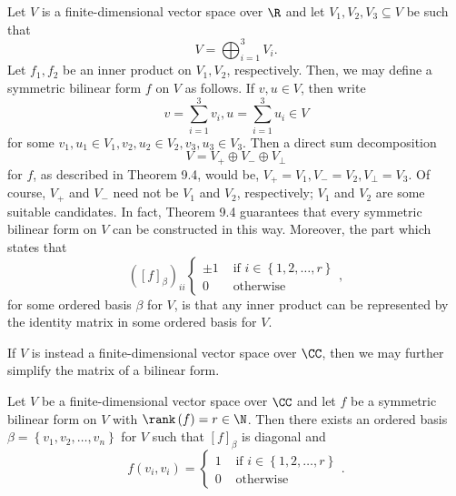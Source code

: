 \documentclass[linearalgebra]{subfiles}
\begin{document}
    \begin{remark}
        Let $V$ is a finite-dimensional vector space over $\R$ and let $V_1,V_2,V_3\subseteq V$ be such that
        \begin{equation*}
            V = \bigoplus^{3}_{i=1} V_i.
        \end{equation*}
        Let $f_1,f_2$ be an inner product on $V_1,V_2$, respectively. Then, we may define a symmetric bilinear form $f$ on $V$ as follows. If $v,u\in V$, then write
        \begin{equation*}
            v = \sum^{3}_{i=1} v_i, u = \sum^{3}_{i=1} u_i\in V
        \end{equation*}
        for some $v_1,u_1\in V_1, v_2,u_2\in V_2, v_3,u_3\in V_3$. Then a direct sum decomposition
        \begin{equation*}
            V = V_+\oplus V_-\oplus V_\perp
        \end{equation*}
        for $f$, as described in Theorem 9.4, would be, $V_+ = V_1, V_- = V_2, V_\perp = V_3$. Of course, $V_+$ and $V_-$ need not be $V_1$ and $V_2$, respectively; $V_1$ and $V_2$ are some suitable candidates. In fact, Theorem 9.4 guarantees that every symmetric bilinear form on $V$ can be constructed in this way. Moreover, the part which states that
        \begin{equation*}
            \left( \left[ f \right] _\beta \right) _{ii} 
            \begin{cases} 
                \pm 1 & \text{ if } i\in\left\lbrace 1,2,\ldots,r \right\rbrace \\ 
                0 & \text{ otherwise }
            \end{cases},
        \end{equation*}
        for some ordered basis $\beta$ for $V$, is that any inner product can be represented by the identity matrix in some ordered basis for $V$.
    \end{remark}

    \begin{remark}
        If $V$ is instead a finite-dimensional vector space over $\CC$, then we may further simplify the matrix of a bilinear form.
    \end{remark}

    \begin{cor}{}
        Let $V$ be a finite-dimensional vector space over $\CC$ and let $f$ be a symmetric bilinear form on $V$ with $\rank\left( f \right) = r\in\N$. Then there exists an ordered basis $\beta = \left\lbrace v_1,v_2,\ldots,v_n \right\rbrace$ for $V$ such that $\left[ f \right] _\beta$ is diagonal and
        \begin{equation*}
            f\left( v_i,v_i \right) = 
            \begin{cases} 
                1 & \text{ if } i\in\left\lbrace 1,2,\ldots,r \right\rbrace \\ 
                0 & \text{ otherwise }
            \end{cases}.
        \end{equation*}
    \end{cor}	
    
\end{document}
